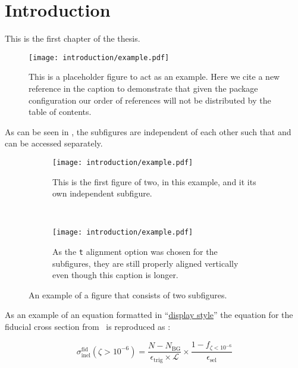 \chapter{Introduction}\label{chapter:introduction}

This is the first chapter of the \gls{thesis}.~\cite{Aaboud:2016mmw,Bruning:782076}

\begin{figure}[htpb]
 \centering
 \texttt{[image: introduction/example.pdf]}
 \caption{This is a placeholder figure to act as an example.
  Here we cite a new reference in the caption to demonstrate that given the package configuration our order of references will not be distributed by the table of contents.~\cite{Higgs:1964ia}}\label{fig:test_figure}
\end{figure}

As can be seen in , the subfigures are independent of each other such that  and  can be accessed separately.

\begin{figure}[htbp]
 \centering
 \begin{subfigure}[t]{0.5\textwidth}
  \centering
  \texttt{[image: introduction/example.pdf]}
  \caption{This is the first figure of two, in this example, and it its own independent subfigure.}
  \label{fig:subfigure_1}
 \end{subfigure}%
 ~
 \begin{subfigure}[t]{0.5\textwidth}
  \centering
  \texttt{[image: introduction/example.pdf]}
  \caption{As the \texttt{t} alignment option was chosen for the subfigures, they are still properly aligned vertically even though this caption is longer.}
  \label{fig:subfigure_2}
 \end{subfigure}
 \caption{An example of a figure that consists of two subfigures.}
 \label{fig:subfigure_example}
\end{figure}

As an example of an equation formatted in ``\href{https://www.overleaf.com/learn/latex/Display_style_in_math_mode}{display style}'' the equation for the fiducial cross section from~\cite{Aaboud:2016mmw} is reproduced as :

\begin{equation}
 \sigma_{\mathrm{inel}}^{\mathrm{fid}} \left(\zeta > 10^{-6}\right) = \frac{N - N_{\mathrm{BG}}}{\epsilon_{\mathrm{trig}} \times \mathcal{L}} \times \frac{1 - f_{\zeta < 10^{-6}}}{\epsilon_{\mathrm{sel}}}
 \label{eq:fiducial_cross_section}
\end{equation}

